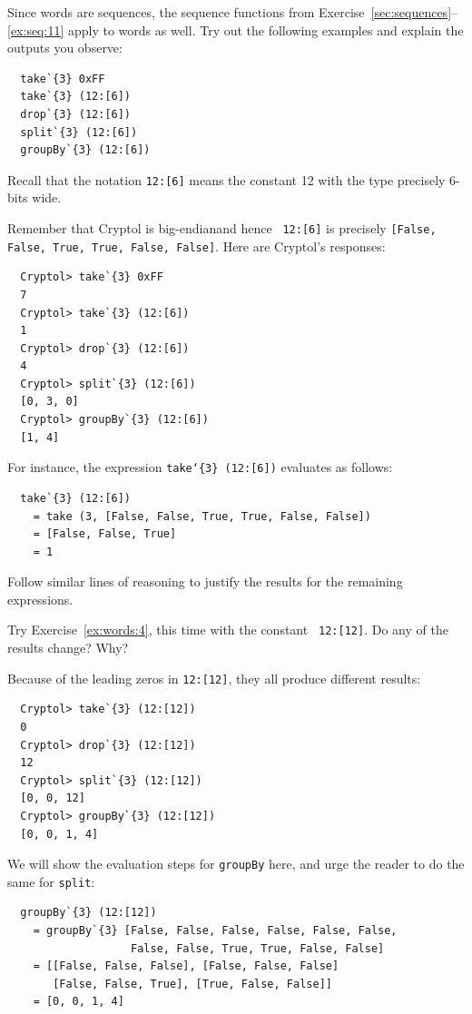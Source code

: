 \begin{Exercise}\label{ex:words:4}
Since words are sequences, the sequence functions from
Exercise~\ref{sec:sequences}--\ref{ex:seq:11} apply to words as well. Try out
the following examples and explain the outputs you
observe:\indTake\indDrop\indSplit\indGroup
\begin{Verbatim}
  take`{3} 0xFF
  take`{3} (12:[6])
  drop`{3} (12:[6])
  split`{3} (12:[6])
  groupBy`{3} (12:[6])
\end{Verbatim}
\end{Exercise}
\noindent Recall that the notation {\tt 12:[6]} means the constant 12
with the type precisely 6-bits wide.
\begin{Answer}
  Remember that Cryptol is big-endian\indEndianness and hence {\tt
    12:[6]} is precisely {\tt [False, False, True, True, False,
    False]}.  Here are Cryptol's responses:\indTake
\begin{Verbatim}
  Cryptol> take`{3} 0xFF
  7
  Cryptol> take`{3} (12:[6])
  1
  Cryptol> drop`{3} (12:[6])
  4
  Cryptol> split`{3} (12:[6])
  [0, 3, 0]
  Cryptol> groupBy`{3} (12:[6])
  [1, 4]
\end{Verbatim}
For instance, the expression {\tt take`\{3\} (12:[6])} evaluates as follows:
\begin{Verbatim}
  take`{3} (12:[6])
    = take (3, [False, False, True, True, False, False])
    = [False, False, True]
    = 1
\end{Verbatim}
Follow similar lines of reasoning to justify the results for the
remaining expressions.
\end{Answer}
\begin{Exercise}\label{ex:words:5}
  Try Exercise~\ref{ex:words:4}, this time with the constant {\tt
    12:[12]}. Do any of the results change? Why?
\end{Exercise}
\begin{Answer}
  Because of the leading zeros in {\tt 12:[12]}, they all produce
  different results:\indTake\indDrop\indSplit\indGroup
\begin{Verbatim}
  Cryptol> take`{3} (12:[12])
  0
  Cryptol> drop`{3} (12:[12])
  12
  Cryptol> split`{3} (12:[12])
  [0, 0, 12]
  Cryptol> groupBy`{3} (12:[12])
  [0, 0, 1, 4]
\end{Verbatim}
We will show the evaluation steps for {\tt groupBy} here, and urge the
reader to do the same for {\tt split}:
\begin{Verbatim}
  groupBy`{3} (12:[12])
    = groupBy`{3} [False, False, False, False, False, False, 
                   False, False, True, True, False, False]
    = [[False, False, False], [False, False, False] 
       [False, False, True], [True, False, False]]
    = [0, 0, 1, 4]
\end{Verbatim}
\end{Answer}

